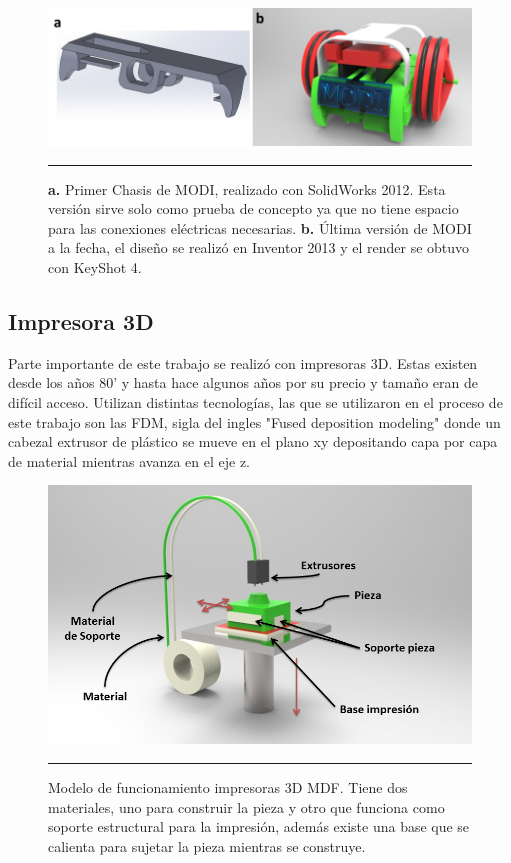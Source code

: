 \begin{figure}[htbp]
	\centering
		\includegraphics[width=\textwidth]{./Figures/MODI/compRender.png}
		\rule{35em}{0.5pt}
	\caption[Comparación entre el primer render realizado y el último]{\textbf{ a.} Primer Chasis de MODI, realizado con SolidWorks 2012. Esta versión sirve solo como prueba de concepto ya que no tiene espacio para las conexiones eléctricas necesarias.\textbf{ b.} Última versión de MODI a la fecha, el diseño se realizó en Inventor 2013 y el render se obtuvo con KeyShot 4.}
	\label{fig:compRender}
\end{figure}	





\subsection{Impresora 3D} \label{cap:impresora3D}

Parte importante de este trabajo se realizó con impresoras 3D. Estas existen desde los años 80' y hasta hace algunos años por su precio y tamaño eran de difícil acceso. Utilizan distintas tecnologías, las que se utilizaron en el proceso de este trabajo son las FDM, sigla del ingles "Fused deposition modeling" donde un cabezal extrusor de plástico se mueve en el plano xy depositando capa por capa de material mientras avanza en el eje z.

\begin{figure}[htbp]
	\centering
		\includegraphics[width=\textwidth]{./Figures/3Dprint.png}
		\rule{35em}{0.5pt}
	\caption[Modelo funcionanmiento Impresora 3D]{Modelo de funcionamiento impresoras 3D MDF. Tiene dos materiales, uno para construir la pieza y otro que funciona como soporte estructural para la impresión, además existe una base que se calienta para sujetar la pieza mientras se construye.}
	\label{fig:3Dprint}
\end{figure}	

